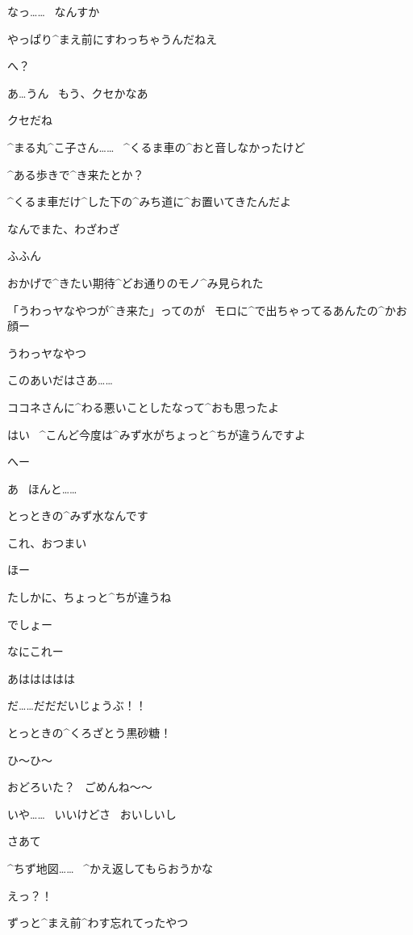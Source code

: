 \Alpha なっ……
\ なんすか

\Maruko やっぱり^{まえ}{前}にすわっちゃうんだねえ

\Alpha へ？

\Alpha あ…うん
\ もう、クセかなあ

\Maruko クセだね

\page
\Alpha ^{まる}{丸}^{こ}{子}さん……
\ ^{くるま}{車}の^{おと}{音}しなかったけど

\Alpha ^{ある}{歩}きで^{き}{来}たとか？

\Maruko ^{くるま}{車}だけ^{した}{下}の^{みち}{道}に^{お}{置}いてきたんだよ

\Alpha なんでまた、わざわざ

\Maruko ふふん

\Maruko おかげで^{きたい}{期待}^{どお}{通}りのモノ^{み}{見}られた

\Maruko 「うわっヤなやつが^{き}{来}た」ってのが
\ モロに^{で}{出}ちゃってるあんたの^{かお}{顔}ー

\Alpha うわっヤなやつ

\page
\Maruko このあいだはさあ……

\Maruko ココネさんに^{わる}{悪}いことしたなって^{おも}{思}ったよ

\page
\Alpha はい
\ ^{こんど}{今度}は^{みず}{水}がちょっと^{ちが}{違}うんですよ

\Maruko へー

\Maruko あ
\ ほんと……

\Alpha とっときの^{みず}{水}なんです

\Alpha これ、おつまい

\Maruko ほー

\Maruko たしかに、ちょっと^{ちが}{違}うね

\Alpha でしょー

\page
\Maruko なにこれー

\Alpha あははははは

\Alpha だ……だだだいじょうぶ！！

\Alpha とっときの^{くろざとう}{黒砂糖}！

\Alpha ひ〜ひ〜

\Alpha おどろいた？
\ ごめんね〜〜

\Maruko いや……
\ いいけどさ
\ おいしいし

\page
\Maruko さあて

\Maruko ^{ちず}{地図}……
\ ^{かえ}{返}してもらおうかな

\Alpha えっ？！

\Maruko ずっと^{まえ}{前}^{わす}{忘}れてったやつ

